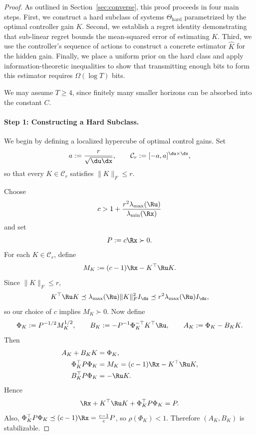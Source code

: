\documentclass[11pt,journal,onecolumn]{IEEEtran}
\begin{document}
\begin{proof}
As outlined in Section~\ref{sec:converse}, this proof proceeds in four main steps. First, we construct a hard subclass of systems $\Theta_{\mathrm{hard}}$ parametrized by the optimal controller gain $K$. Second, we establish a regret identity demonstrating that sub-linear regret bounds the mean-squared error of estimating $K$. Third, we use the controller's sequence of actions to construct a concrete estimator $\widehat{K}$ for the hidden gain. Finally, we place a uniform prior on the hard class and apply information-theoretic inequalities to show that transmitting enough bits to form this estimator requires $\Omega(\log T)$ bits.

We may assume $T\ge 4$, since finitely many smaller horizons can be absorbed into the constant $C$.

\paragraph{Step 1: Constructing a Hard Subclass.} We begin by defining a localized hypercube of optimal control gains.
Set
\begin{equation}\label{eq:cube-def}
    a:=\frac{r}{\sqrt{\du\dx}},
    \qquad
    \mathcal{C}_r := [-a,a]^{\du\times \dx},
\end{equation}
so that every $K\in\mathcal{C}_r$ satisfies $\|K\|_F\le r$.

\medskip
Choose
\begin{equation}\label{eq:c-choice}
    c > 1 + \frac{r^2\lambda_{\max}(\Ru)}{\lambda_{\min}(\Rx)}
\end{equation}
and set
\begin{equation}\label{eq:P-def-converse}
    P:=c\Rx\succ 0.
\end{equation}
For each $K\in\mathcal{C}_r$, define
\begin{equation}\label{eq:MK-def}
    M_K := (c-1)\Rx - K^\top \Ru K.
\end{equation}
Since $\|K\|_F\le r$,
\begin{equation}\label{eq:KRuK-bound}
    K^\top \Ru K \preceq \lambda_{\max}(\Ru)\|K\|_F^2 I_{\dx}
    \preceq r^2\lambda_{\max}(\Ru) I_{\dx},
\end{equation}
so our choice of $c$ implies $M_K\succ 0$. Now define
\begin{equation}\label{eq:hard-instance-def}
    \Phi_K := P^{-1/2} M_K^{1/2},
    \qquad
    B_K := -P^{-1}\Phi_K^{-\top} K^\top \Ru,
    \qquad
    A_K := \Phi_K - B_KK.
\end{equation}
Then
\begin{align}
    A_K+B_KK &= \Phi_K, \label{eq:ABK-identity} \\
    \Phi_K^\top P\Phi_K &= M_K = (c-1)\Rx - K^\top \Ru K, \label{eq:PhiK-identity} \\
    B_K^\top P\Phi_K &= -\Ru K. \label{eq:BK-cross-term}
\end{align}
Hence
\begin{equation}\label{eq:dare-verification}
    \Rx + K^\top \Ru K + \Phi_K^\top P\Phi_K = P.
\end{equation}
Also, $\Phi_K^\top P\Phi_K \preceq (c-1)\Rx = \frac{c-1}{c}P$,
so $\rho(\Phi_K)<1$. Therefore $(A_K,B_K)$ is stabilizable.


\end{proof}
\end{document}
